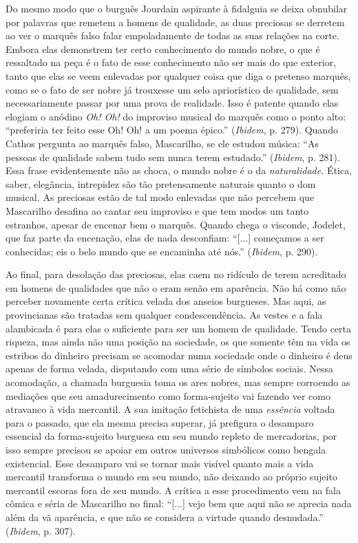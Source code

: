Do mesmo modo que o burguês Jourdain aspirante à fidalguia se deixa
obnubilar por palavras que remetem a homens de qualidade, as duas
preciosas se derretem ao ver o marquês falso falar empoladamente de
todas as suas relações na corte. Embora elas demonstrem ter certo
conhecimento do mundo nobre, o que é ressaltado na peça é o fato de esse
conhecimento não ser mais do que exterior, tanto que elas se veem
enlevadas por qualquer coisa que diga o pretenso marquês, como se o fato
de ser nobre já trouxesse um selo apriorístico de qualidade, sem
necessariamente passar por uma prova de realidade. Isso é patente quando
elas elogiam o anódino \emph{Oh! Oh!} do improviso musical do marquês
como o ponto alto: ``preferiria ter feito esse Oh! Oh! a um poema
épico.'' (\emph{Ibidem}, p. 279). Quando Cathos pergunta ao marquês
falso, Mascarilho, se ele estudou música: ``As pessoas de qualidade
sabem tudo sem nunca terem estudado.'' (\emph{Ibidem}, p. 281). Essa
frase evidentemente não as choca, o mundo nobre é o da
\emph{naturalidade.} Ética, saber, elegância, intrepidez são tão
pretensamente naturais quanto o dom musical\emph{.} As preciosas estão
de tal modo enlevadas que não percebem que Mascarilho desafina ao cantar
seu improviso e que tem modos um tanto estranhos, apesar de encenar bem
o marquês. Quando chega o visconde, Jodelet, que faz parte da encenação,
elas de nada desconfiam: ``{[}...{]} começamos a ser conhecidas; eis o
belo mundo que se encaminha até nós.'' (\emph{Ibidem}, p. 290).

Ao final, para desolação das preciosas, elas caem no ridículo de terem
acreditado em homens de qualidades que não o eram senão em aparência.
Não há como não perceber novamente certa crítica velada dos anseios
burgueses. Mas aqui, as provincianas são tratadas sem qualquer
condescendência. As vestes e a fala alambicada é para elas o suficiente
para ser um homem de qualidade. Tendo certa riqueza, mas ainda não uma
posição na sociedade, os que somente têm na vida os estribos do dinheiro
precisam se acomodar numa sociedade onde o dinheiro é deus apenas de
forma velada, disputando com uma série de símbolos sociais. Nessa
acomodação, a chamada burguesia toma os ares nobres, mas sempre
corroendo as mediações que seu amadurecimento como forma-sujeito vai
fazendo ver como atravanco à vida mercantil. A sua imitação fetichista
de uma \emph{essência} voltada para o passado, que ela mesma precisa
superar, já prefigura o desamparo essencial da forma-sujeito burguesa em
seu mundo repleto de mercadorias, por isso sempre precisou se apoiar em
outros universos simbólicos como bengala existencial. Esse desamparo vai
se tornar mais visível quanto mais a vida mercantil transforma o mundo
em seu mundo, não deixando ao próprio sujeito mercantil escoras fora de
seu mundo. A crítica a esse procedimento vem na fala cômica e séria de
Mascarilho no final: ``{[}...{]} vejo bem que aqui não se aprecia nada
além da vã aparência, e que não se considera a virtude quando
desnudada.'' (\emph{Ibidem}, p. 307).

